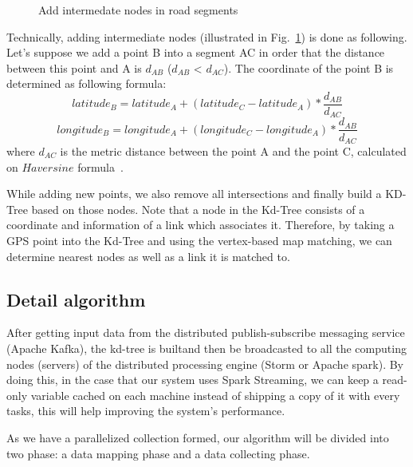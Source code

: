 \documentclass{acm_proc_article-sp}
\begin{document}
	
\begin{figure}[h]
\centering
{}
\caption{Add intermedate nodes in road segments}
\label{fig:addPointsToRoad}
\end{figure}
	
Technically, adding intermediate nodes (illustrated in Fig.~\ref{fig:addPointsToRoad}) is done as following. Let's suppose we add a point B into a segment AC in order that the distance between this point and A is $d_{AB}$ ($d_{AB}$ < $d_{AC}$). The coordinate of the point B is determined as following formula:
\[ latitude_{B} = latitude_{A} + (latitude_{C} - latitude_{A}) \ast \frac{d_{AB}}{d_{AC}}\]
\[ longitude_{B} = longitude_{A} + (longitude_{C} - longitude_{A}) \ast \frac{d_{AB}}{d_{AC}}\]
where $d_{AC}$ is the metric distance between the point A and the point C, calculated on $Haversine$ formula~\cite{haversineweb}.

While adding new points, we also remove all intersections and finally build a KD-Tree based on those nodes. Note that a node in the Kd-Tree consists of a coordinate and information of a link which associates it. Therefore, by taking a GPS point into the Kd-Tree and using the vertex-based map matching, we can determine nearest nodes as well as a link it is matched to.
	
\subsection{Detail algorithm}
		
After getting input data from the distributed publish-subscribe messaging service (Apache Kafka), the kd-tree is builtand then be broadcasted to all the computing nodes (servers) of the distributed processing engine (Storm or Apache spark). By doing this, in the case that our system uses Spark Streaming, we can keep a read-only variable cached on each machine instead of shipping a copy of it with every tasks, this will help improving the system's performance.
	
As we have a parallelized collection formed, our algorithm will be divided into two phase: a data mapping phase and a data collecting phase. 
\end{document}

